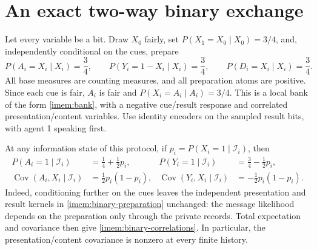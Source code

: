 \section{An exact two-way binary exchange}

Let every variable be a bit. Draw $X_0$ fairly, set $P(X_1=X_0\mid X_0)=3/4$, and, independently conditional on the cues, prepare
\begin{equation}
 P(A_i=X_i\mid X_i)=\frac34,\qquad
 P(Y_i=1-X_i\mid X_i)=\frac34,\qquad
 P(D_i=X_i\mid X_i)=\frac34.
 \label{imem:binary-preparation}
\end{equation}
All base measures are counting measures, and all preparation atoms are positive. Since each cue is fair, $A_i$ is fair and $P(X_i=A_i\mid A_i)=3/4$. This is a local bank of the form \cref{imem:bank}, with a negative cue/result response and correlated presentation/content variables. Use identity encoders on the sampled result bits, with agent 1 speaking first.

At any information state of this protocol, if $p_i=P(X_i=1\mid\mathcal I_i)$, then
\begin{equation}
 \begin{aligned}
 P(A_i=1\mid\mathcal I_i)&=\frac14+\frac12p_i,&
 P(Y_i=1\mid\mathcal I_i)&=\frac34-\frac12p_i,\\
 \operatorname{Cov}(A_i,X_i\mid\mathcal I_i)&=\frac12p_i(1-p_i),&
 \operatorname{Cov}(Y_i,X_i\mid\mathcal I_i)&=-\frac12p_i(1-p_i).
 \end{aligned}
 \label{imem:binary-correlations}
\end{equation}
Indeed, conditioning further on the cues leaves the independent presentation and result kernels in \cref{imem:binary-preparation} unchanged: the message likelihood depends on the preparation only through the private records. Total expectation and covariance then give \cref{imem:binary-correlations}. In particular, the presentation/content covariance is nonzero at every finite history.

